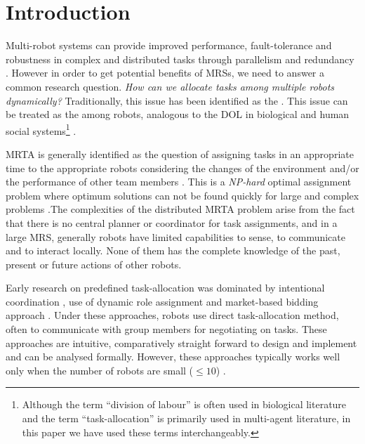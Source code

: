 \documentclass[final,5p,times,twocolumn]{elsarticle}
\begin{document}
\begin{frontmatter}
\begin{abstract}
\end{abstract}
\end{frontmatter}
\section{Introduction}
\label{sec:intro}
 Multi-robot systems can provide improved performance, fault-tolerance and robustness in complex and distributed tasks through parallelism and redundancy \cite{Arkin1998,Parker+2006}. However in order to get potential benefits of \aclp{MRS}, we need to answer a common research question. \textit{How can we allocate tasks among multiple robots dynamically?} Traditionally, this issue has been identified as the  \cite{Gerkey+2004}. This issue can be treated as the  among robots, analogous to the DOL in biological and human social systems\footnote{Although the term ``division of labour'' is often used in biological literature and the term ``task-allocation'' is primarily used in multi-agent literature,  in this paper we have used these terms interchangeably.} \cite{Sendova-Franks+1999}.

MRTA is generally identified as the question of assigning tasks in an appropriate time to the appropriate robots considering the changes of the environment and/or the performance of other team members \cite{Gerkey+2003}. This is a {\em NP-hard} optimal assignment problem where optimum solutions can not be found quickly for large and complex problems \cite{Parker2008}.The complexities of the distributed MRTA problem arise from the fact that there is no central planner or coordinator for task assignments, and in a large \acl{MRS}, generally robots have limited capabilities to sense, to communicate and to interact locally. None of them has the complete knowledge of the past, present or future actions of other robots.

Early research on predefined task-allocation was dominated by intentional coordination \cite{Parker2008}, use of dynamic role assignment \cite{Chaimowicz2002} and market-based bidding approach \cite{Dias+2006}. Under these approaches, robots use direct task-allocation method, often to communicate with group members for negotiating on tasks. These approaches are intuitive, comparatively straight forward to design and implement and can be analysed formally. However, these approaches typically works well only when the number of robots are small ($\leq 10$) \cite{Lerman+2006}.
\end{document}
